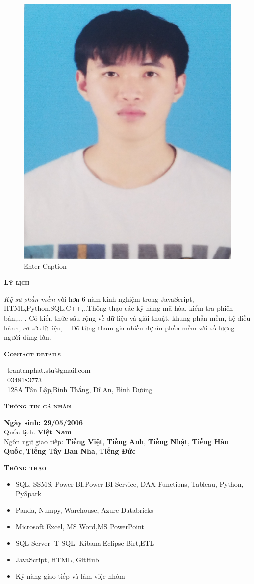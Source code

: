\documentclass[11pt, a4paper]{article}
\newcommand{\headleft}[1]{\vspace*{3ex}\textsc{\textbf{#1}}\par%
    \vspace*{-1.5ex}\hrulefill\par\vspace*{0.7ex}}
\begin{document}
\begin{minipage}[t]{0.33\textwidth}
{\begin{minipage}[t][293mm][t]{0.82\textwidth}
\vspace*{0.5ex} %
\begin{figure}
    \centering
    \includegraphics[width=0.5\linewidth]{Trần Tấn Phát.jpg}
    \caption{Enter Caption}
    \label{fig:enter-label}
\end{figure}
\headleft{Lý lịch}
\textit{Kỹ sư phần mềm} với hơn 6 năm kinh nghiệm trong JavaScript, HTML,Python,SQL,C++,..Thông thạo các kỹ năng mã hóa, kiểm tra phiên bản,... . Có kiến thức sâu rộng về dữ liệu và giải thuật, khung phần mềm, hệ điều hành, cơ sở dữ liệu,... Đã từng tham gia nhiều dự án phần mềm với số lượng người dùng lớn.

\headleft{Contact details}
\small %
\MVAt\ {\small trantanphat.stu@gmail.com} \\[0.4ex]
\Mobilefone\ 0348183773 \\[0.5ex]
\Letter\ 128A Tân Lập,Bình Thắng, Dĩ An, Bình Dương
\normalsize

\headleft{Thông tin cá nhân}
\textbf{Ngày sinh: 29/05/2006} \\[0.5ex]
Quốc tịch: \textbf{Việt Nam} \\[0.5ex]
Ngôn ngữ giao tiếp: \textbf{Tiếng Việt}, \textbf{Tiếng Anh}, \textbf{Tiếng Nhật}, \textbf{Tiếng Hàn Quốc}, \textbf{Tiếng Tây Ban Nha}, \textbf{Tiếng Đức}

\headleft{Thông thạo}
\begin{itemize}
\item SQL, SSMS, Power BI,Power BI Service, DAX Functions,
Tableau, Python, PySpark
\item Panda, Numpy, Warehouse, Azure Databricks
\item Microsoft Excel, MS Word,MS PowerPoint
\item SQL Server, T-SQL, Kibana,Eclipse Birt,ETL
\item JavaScript, HTML, GitHub
\item Kỹ năng giao tiếp và làm việc nhóm
\end{itemize} 

\end{minipage}%
\textwidth\relax%
}
\end{minipage}%
\end{document}
